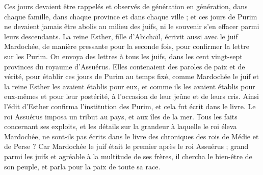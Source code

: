 \begin{multicols}{2}
Ces jours devaient être rappelés et observés de génération en génération, dans chaque famille, dans chaque province et dans chaque ville ; et ces jours de Purim ne devaient jamais être abolis au milieu des juifs, ni le souvenir s’en effacer parmi leurs descendants.
La reine Esther, fille d'Abichaïl, écrivit aussi avec le juif Mardochée, de manière pressante pour la seconde fois, pour confirmer la lettre sur les Purim.
On envoya des lettres à tous les juifs, dans les cent vingt-sept provinces du royaume d'Assuérus. Elles contenaient des paroles de paix et de vérité,
pour établir ces jours de Purim au temps fixé, comme Mardochée le juif et la reine Esther les avaient établis pour eux, et comme ils les avaient établis pour eux-mêmes et pour leur postérité, à l’occasion de leur jeûne et de leurs cris.
Ainsi l'édit d'Esther confirma l’institution des Purim, et cela fut écrit dans le livre.
\VerseOne{}Le roi Assuérus imposa un tribut au pays, et aux îles de la mer.
Tous les faits concernant ses exploits, et les détails sur la grandeur à laquelle le roi éleva Mardochée, ne sont-ils pas écrits dans le livre des chroniques des rois de Médie et de Perse ?
Car Mardochée le juif était le premier après le roi Assuérus ; grand parmi les juifs et agréable à la multitude de ses frères, il chercha le bien-être de son peuple, et parla pour la paix de toute sa race.
\PPE{}
\end{multicols}
